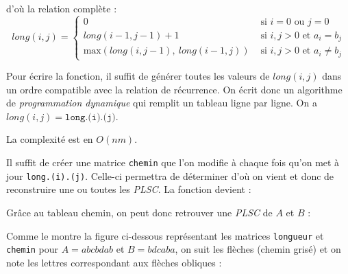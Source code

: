 d'où la relation complète :
\[
    long(i,j) = \begin{cases}
        0 & \textrm{ si } i=0 \textrm{ ou } j=0\\
        long(i-1, j-1) + 1 & \textrm{ si } i,j > 0 \textrm{ et } a_i=b_j\\
        \textrm{max}(long(i, j-1),\ long(i-1, j)) & \textrm{ si } i,j > 0 \textrm{ et } a_i \neq b_j\end{cases}
\]

Pour écrire la fonction, il suffit de générer toutes les valeurs de $long(i,j)$ dans un ordre compatible avec la relation de récurrence. On écrit donc un algorithme de \textit{programmation dynamique} qui remplit un tableau ligne par ligne. On a $long(i,j)=\texttt{long.(i).(j)}$.



La complexité est en $O(nm)$.

\Q
Il suffit de créer une matrice \texttt{chemin} que l'on modifie à chaque fois qu'on met à jour \texttt{long.(i).(j)}. Celle-ci permettra de déterminer \og d'où on vient \fg{} et donc de reconstruire une ou toutes les \textit{PLSC}. La fonction devient :



Grâce au tableau chemin, on peut donc retrouver une \textit{PLSC} de $A$ et $B$ :


\bigskip

Comme le montre la figure ci-dessous représentant les matrices \texttt{longueur} et \texttt{chemin} pour $A=abcbdab$ et $B=bdcaba$, on suit les flèches (chemin grisé) et on note les lettres correspondant aux flèches obliques :

\newcommand{\CC}{\cellcolor{lightgray}}

